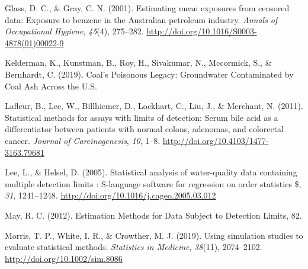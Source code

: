 \documentclass[12pt, twoside]{amherstthesis}
\newlength{\cslhangindent}
\newenvironment{cslreferences}%
  {\setlength{\parindent}{0pt}%
  \everypar{\setlength{\hangindent}{\cslhangindent}}\ignorespaces}%
  {\par}
\begin{document}
\begin{cslreferences}
\leavevmode\hypertarget{ref-Glass2001}{}%
Glass, D. C., \& Gray, C. N. (2001). Estimating mean exposures from censored data: Exposure to benzene in the Australian petroleum industry. \emph{Annals of Occupational Hygiene}, \emph{45}(4), 275--282. \url{http://doi.org/10.1016/S0003-4878(01)00022-9}

\leavevmode\hypertarget{ref-Kelderman2019}{}%
Kelderman, K., Kunstman, B., Roy, H., Sivakumar, N., Mccormick, S., \& Bernhardt, C. (2019). Coal's Poisonous Legacy: Groundwater Contaminated by Coal Ash Across the U.S.

\leavevmode\hypertarget{ref-Lafleur2011}{}%
Lafleur, B., Lee, W., Billhiemer, D., Lockhart, C., Liu, J., \& Merchant, N. (2011). Statistical methods for assays with limits of detection: Serum bile acid as a differentiator between patients with normal colons, adenomas, and colorectal cancer. \emph{Journal of Carcinogenesis}, \emph{10}, 1--8. \url{http://doi.org/10.4103/1477-3163.79681}

\leavevmode\hypertarget{ref-Lee2005}{}%
Lee, L., \& Helsel, D. (2005). Statistical analysis of water-quality data containing multiple detection limits : S-language software for regression on order statistics \$, \emph{31}, 1241--1248. \url{http://doi.org/10.1016/j.cageo.2005.03.012}

\leavevmode\hypertarget{ref-May2012}{}%
May, R. C. (2012). Estimation Methods for Data Subject to Detection Limits, 82.

\leavevmode\hypertarget{ref-Morris2019}{}%
Morris, T. P., White, I. R., \& Crowther, M. J. (2019). Using simulation studies to evaluate statistical methods. \emph{Statistics in Medicine}, \emph{38}(11), 2074--2102. \url{http://doi.org/10.1002/sim.8086}
\end{cslreferences}
\end{document}
